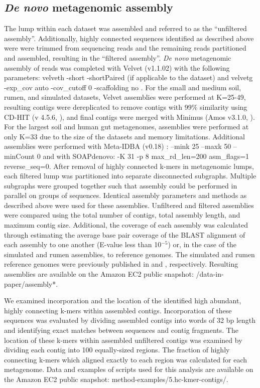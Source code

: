 \documentclass[10pt]{article}
\begin{document}
\subsection*{\emph{De novo} metagenomic assembly}

The lump within each dataset was assembled and referred to as the
``unfiltered assembly''.  Additionally, highly connected sequences
identified as described above were were trimmed from sequencing reads
and the remaining reads partitioned and assembled, resulting in the
``filtered assembly''.  \emph{De novo} metagenomic assembly of reads
was completed with Velvet (v1.1.02) with the following parameters:
velveth -short -shortPaired (if applicable to the dataset) and velvetg
-exp\_cov auto -cov\_cutoff 0 -scaffolding no \cite{Zerbino:2008p665}.
For the small and medium soil, rumen, and simulated datasets, Velvet
assemblies were performed at K=25-49, resulting contigs were
dereplicated to remove contigs with 99\% similarity using CD-HIT (v
4.5.6, \cite{Li:2001p1337}), and final contigs were merged with
Minimus (Amos v3.1.0, \cite{Sommer:2007p1253}).  For the largest soil
and human gut metagenomes, assemblies were performed at only K=33 due
to the size of the datasets and memory limitations.  Additional
assemblies were performed with Meta-IDBA (v0.18) \cite{Peng:2011p898}
: --mink 25 --maxk 50 --minCount 0 and with SOAPdenovo: -K 31 -p 8
max\_rd\_len=200 asm\_flags=1 reverse\_seq=0.  After removal of highly
connected k-mers in metagenomic lumps, each filtered lump was
partitioned into separate disconnected subgraphs.  Multiple subgraphs
were grouped together such that assembly could be performed in
parallel on groups of sequences.  Identical assembly parameters and
methods as described above were used for these assemblies.  Unfiltered
and filtered assemblies were compared using the total number of
contigs, total assembly length, and maximum contig size.  Additional,
the coverage of each assembly was calculated through estimating the
average base pair coverage of the BLAST alignment of each assembly to
one another (E-value less than 10$^{-5}$) or, in the case of the
simulated and rumen assemblies, to reference genomes.  The simulated
and rumen reference genomes were previously published in
\cite{Hess:2011p686} and \cite{Pignatelli:2011p742}, respectively.
Resulting assemblies are available on the Amazon EC2 public snapshot:
/data-in-paper/assembly*.

We examined incorporation and the location of the identified high
abundant, highly connecting k-mers within assembled contigs.
Incorporation of these sequences was evaluated by dividing assembled
contigs into words of 32 bp length and identifying exact matches
between sequences and contig fragments.  The location of these k-mers
within assembled unfiltered contigs was examined by dividing each
contig into 100 equally-sized regions.  The fraction of highly
connecting k-mers which aligned exactly to each region was calculated
for each metagenome. Data and examples of scripts used for this
analysis are available on the Amazon EC2 public snapshot:
method-examples/5.hc-kmer-contigs/.
\end{document}

